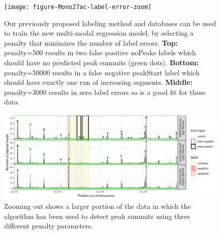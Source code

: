 \documentclass{article}
\begin{document}

\begin{figure}
  \centering
  \texttt{[image: figure-Mono27ac-label-error-zoom]}
  \caption{Our previously proposed labeling method and databases can
    be used to train the new multi-modal regression model, by
    selecting a penalty that minimizes the number of label
    errors. \textbf{Top:} penalty=500 results in two false positive
    noPeaks labels which should have no predicted peak summits (green
    dots). \textbf{Bottom:} penalty=50000 results in a false negative
    peakStart label which should have exactly one run of increasing
    segments. \textbf{Middle:} penalty=3000 results in zero label
    errors so is a good fit for these data.}
  \label{fig:label-error}
\end{figure}

\begin{figure}
  \centering
  \includegraphics[width=\textwidth]{figure-Mono27ac-label-error}
  \caption{Zooming out shows a larger portion of the data in which the algorithm has been used to detect peak summits using three different penalty parameters.}
  \label{fig:zoom-out}
\end{figure}



\end{document}
